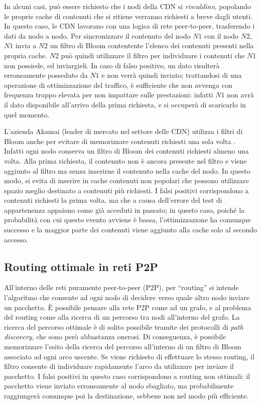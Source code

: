 In alcuni casi, può essere richiesto che i nodi della CDN si \emph{riscaldino}, popolando le
proprie cache di contenuti che si ritiene verranno richiesti a breve dagli utenti. In questo caso,
le CDN lavorano con una logica di rete peer-to-peer, trasferendo i dati da nodo a nodo. Per sincronizzare
il contenuto del nodo $N1$ con il nodo $N2$, $N1$ invia a $N2$ un filtro di Bloom contentente
l'elenco dei contenuti presenti nella propria cache. $N2$ può quindi utilizzare il filtro
per individuare i contenuti che $N1$ non possiede, ed inviargieli. In caso di falso positivo,
un dato risulterà erroneamente posseduto da $N1$ e non verrà quindi inviato; trattandosi di una
operazione di ottimizzazione del traffico, è sufficiente che non avvenga con frequenza troppo 
elevata per non impattare sulle prestazioni: infatti $N1$ non avrà il dato disponibile all'arrivo
della prima richiesta, e si occuperà di scaricarlo in quel momento. 

L'azienda Akamai (leader di mercato nel settore delle CDN) utilizza i filtri di Bloom anche per
evitare di memorizzare contenuti richiesti una sola volta \cite{bloom-akamai}. Infatti ogni nodo
conserva un filtro di Bloom dei contenuti richiesti almeno una volta. Alla prima richiesta, il
contenuto non è ancora presente nel filtro e viene aggiunto al filtro ma senza inserirne il
contenuto nella cache del nodo. In questo modo, si evita di inserire in cache contenuti non popolari
che possono utilizzare spazio meglio destinato a contenuti più richiesti. I falsi positivi
corrispondono a contenuti richiesti la prima volta, ma che a causa dell'errore del test di appartenenza
appaiono come già acceduti in passato; in questo caso, poiché la probabilità con cui questo
evento avviene è bassa, l'ottimizzazione ha comunque successo e la maggior parte dei contenuti
viene aggiunto alla cache solo al secondo accesso.

\subsection{Routing ottimale in reti P2P}

All'interno delle reti puramente peer-to-peer (P2P), per ``routing'' si intende l'algoritmo che consente ad ogni nodo di
decidere verso quale altro nodo inviare un pacchetto. È possibile pensare alla rete P2P come
ad un grafo, e al problema del routing come alla ricerca di un percorso tra nodi all'interno
del grafo. La ricerca del percorso ottimale è di solito possibile tramite dei protocolli di 
\emph{path discovery}, che sono però abbastanza onerosi. Di conseguenza, è possibile memorizzare
l'esito della ricerca del percorso all'interno di un filtro di Bloom associato ad ogni arco uscente.
Se viene richiesto di effettuare lo stesso routing, il filtro consente di individuare
rapidamente l'arco da utilizzare per inviare il pacchetto. I falsi positivi in questo caso
corrispondono a routing non ottimali: il pacchetto viene inviato erroneamente al nodo sbagliato,
ma probabilmente raggiungerà comunque poi la destinazione, sebbene non nel modo più efficiente. 

